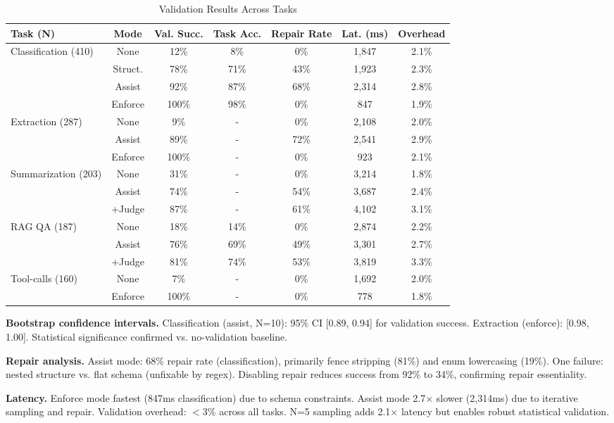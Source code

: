 \documentclass[sigconf]{acmart}
\begin{document}
\begin{table}[t]
\centering
\caption{Validation Results Across Tasks}
\label{tab:results}
\scriptsize
\begin{tabular}{@{}lcccccc@{}}
\toprule
\textbf{Task (N)} & \textbf{Mode} & \textbf{Val. Succ.} & \textbf{Task Acc.} & \textbf{Repair Rate} & \textbf{Lat. (ms)} & \textbf{Overhead} \\
\midrule
Classification (410) & None & 12\% & 8\% & 0\% & 1,847 & 2.1\% \\
 & Struct. & 78\% & 71\% & 43\% & 1,923 & 2.3\% \\
 & Assist & 92\% & 87\% & 68\% & 2,314 & 2.8\% \\
 & Enforce & 100\% & 98\% & 0\% & 847 & 1.9\% \\
\midrule
Extraction (287) & None & 9\% & - & 0\% & 2,108 & 2.0\% \\
 & Assist & 89\% & - & 72\% & 2,541 & 2.9\% \\
 & Enforce & 100\% & - & 0\% & 923 & 2.1\% \\
\midrule
Summarization (203) & None & 31\% & - & 0\% & 3,214 & 1.8\% \\
 & Assist & 74\% & - & 54\% & 3,687 & 2.4\% \\
 & +Judge & 87\% & - & 61\% & 4,102 & 3.1\% \\
\midrule
RAG QA (187) & None & 18\% & 14\% & 0\% & 2,874 & 2.2\% \\
 & Assist & 76\% & 69\% & 49\% & 3,301 & 2.7\% \\
 & +Judge & 81\% & 74\% & 53\% & 3,819 & 3.3\% \\
\midrule
Tool-calls (160) & None & 7\% & - & 0\% & 1,692 & 2.0\% \\
 & Enforce & 100\% & - & 0\% & 778 & 1.8\% \\
\bottomrule
\end{tabular}
\end{table}

\textbf{Bootstrap confidence intervals.} Classification (assist, N=10): 95\% CI [0.89, 0.94] for validation success. Extraction (enforce): [0.98, 1.00]. Statistical significance confirmed vs. no-validation baseline.

\textbf{Repair analysis.} Assist mode: 68\% repair rate (classification), primarily fence stripping (81\%) and enum lowercasing (19\%). One failure: nested structure vs. flat schema (unfixable by regex). Disabling repair reduces success from 92\% to 34\%, confirming repair essentiality.

\textbf{Latency.} Enforce mode fastest (847ms classification) due to schema constraints. Assist mode 2.7\(\times\) slower (2,314ms) due to iterative sampling and repair. Validation overhead: \(<\)3\% across all tasks. N=5 sampling adds 2.1\(\times\) latency but enables robust statistical validation.
\end{document}
